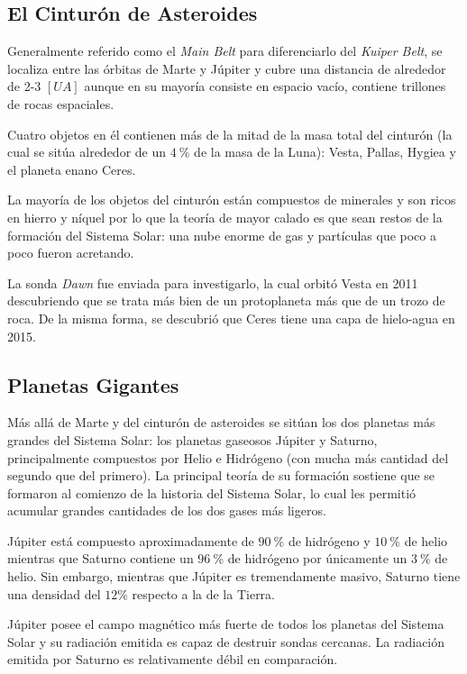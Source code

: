 \documentclass{tufte-handout}
\begin{document}
\subsection{El Cinturón de Asteroides}

Generalmente referido como el \emph{Main Belt} para diferenciarlo del \emph{Kuiper Belt}, se localiza entre las órbitas de Marte y Júpiter y cubre una distancia de alrededor de 2-3 $[UA]$ aunque en su mayoría consiste en espacio vacío, contiene trillones de rocas espaciales.

Cuatro objetos en él contienen más de la mitad de la masa total del cinturón (la cual se sitúa alrededor de un $4~\%$ de la masa de la Luna): Vesta, Pallas, Hygiea y el planeta enano Ceres.

La mayoría de los objetos del cinturón están compuestos de minerales y son ricos en hierro y níquel por lo que la teoría de mayor calado es que sean restos de la formación del Sistema Solar: una nube enorme de gas y partículas que poco a poco fueron acretando.

La sonda \emph{Dawn} fue enviada para investigarlo, la cual orbitó Vesta en 2011 descubriendo que se trata más bien de un protoplaneta más que de un trozo de roca. De la misma forma, se descubrió que Ceres tiene una capa de hielo-agua en 2015.

\subsection{Planetas Gigantes}

Más allá de Marte y del cinturón de asteroides se sitúan los dos planetas más grandes del Sistema Solar: los planetas gaseosos Júpiter y Saturno, principalmente compuestos por Helio e Hidrógeno (con mucha más cantidad del segundo que del primero). La principal teoría de su formación sostiene que se formaron al comienzo de la historia del Sistema Solar, lo cual les permitió acumular grandes cantidades de los dos gases más ligeros.

Júpiter está compuesto aproximadamente de $90~\%$ de hidrógeno y $10~\%$ de helio mientras que Saturno contiene un $96~\%$ de hidrógeno por únicamente un $3~\%$ de helio. Sin embargo, mientras que Júpiter es tremendamente masivo, Saturno tiene una densidad del $12\%$ respecto a la de la Tierra.

Júpiter posee el campo magnético más fuerte de todos los planetas del Sistema Solar y su radiación emitida es capaz de destruir sondas cercanas. La radiación emitida por Saturno es relativamente débil en comparación.
\end{document}
